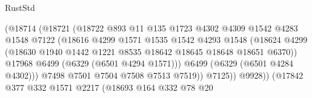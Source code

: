\begin{lexlean}{RustStd}
\begin{coremodule}
{{                                    (@18714
                                      (@18721
                                        (@18722
                                          @893
                                          @11
                                          @135
                                          @1723
                                          @4302
                                          @4309
                                          @1542
                                          @4283
                                          @1548
                                          @7122
                                          (@18616
                                            @4299
                                            @1571
                                            @1535
                                            @1542
                                            @4293
                                            @1548
                                            (@18624
                                              @4299
                                              (@18630
                                                @1940
                                                @1442
                                                @1221
                                                @8535
                                                @18642
                                                @18645
                                                @18648
                                                @18651
                                                @6370))
                                            @17968
                                            @6499
                                            (@6329 (@6501 @4294 @1571)))
                                          @6499
                                          (@6329 (@6501 @4284 @4302)))
                                        @7498
                                        @7501
                                        @7504
                                        @7508
                                        @7513
                                        @7519))
                                    @7125))
                                @9928))
                            (@17842
                              @377
                              @332
                              @1571
                              @2217
                              (@18693
                                @164
                                @332
                                @78
                                @20
}}
\end{coremodule}
\end{lexlean}
